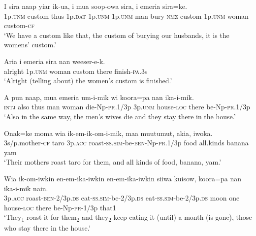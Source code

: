 \ea\label{ex:a:x26}
\gll  I  sira  naap  yiar  ik-ua,  i  mua  soop-owa  sira,          i  emeria  sira=ke. \\
1p.\textsc{unm}  custom  thus  1p.\textsc{dat}  1p.\textsc{unm}  1p.\textsc{unm}  man  bury-\textsc{nmz}  custom 1p.\textsc{unm}  woman  custom-\textsc{cf} \\


\glt ‘We have a custom like that, the custom of burying our husbands, it is the womens’ custom.’ \\
\z


\ea\label{ex:a:x27}
\gll  Aria  i  emeria  sira  nan  weeser-e-k. \\
alright  1p.\textsc{unm}  woman  custom  there  finish-\textsc{pa}.3s \\
\glt ‘Alright (telling about) the women’s custom is finished.’ \\
\z


\ea\label{ex:a:x28}
\gll  A  pun  naap,  mua  emeria  um-i-mik  wi  koora=pa  nan          ika-i-mik. \\
\textsc{intj}  also  thus  man  woman  die-Np-\textsc{pr}.1/3p  3p.\textsc{unm}  house-\textsc{loc}  there be-Np-\textsc{pr}.1/3p \\


\glt ‘Also in the same way, the men’s wives die and they stay there in the house.’ \\
\z


\ea\label{ex:a:x29}
\gll  Onak=ke  moma  wia  ik-em-ik-om-i-mik,  maa                   muutumut,  akia,  iwoka. \\
3s/p.mother-\textsc{cf}  taro  3p.\textsc{acc}  roast-\textsc{ss}.\textsc{sim}-be-\textsc{ben}-Np-\textsc{pr}.1/3p  food  all.kinds  banana  yam \\


\glt ‘Their mothers roast taro for them, and all kinds of food, banana, yam.’ \\
\z


\ea\label{ex:a:x30}
\gll  Wia  ik-om-iwkin  en-em-ika-iwkin  en-em-ika-iwkin                siiwa  kuisow,  koora=pa  nan  ika-i-mik  nain. \\
3p.\textsc{acc}  roast-\textsc{ben}-2/3p.\textsc{ds}  eat-\textsc{ss}.\textsc{sim}-be-2/3p.\textsc{ds}  eat-\textsc{ss}.\textsc{sim}-be-2/3p.\textsc{ds} moon  one  house-\textsc{loc}  there  be-Np-\textsc{pr}-1/3p  that1 \\


\glt ‘They\textsubscript{1} roast it for them\textsubscript{2 }and they\textsubscript{2} keep eating it (until) a month (is gone), those who stay there in the house.’ \\
\z


